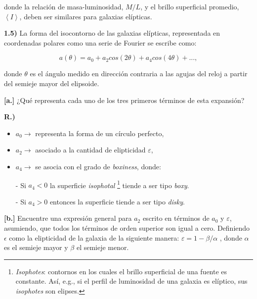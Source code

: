 \documentclass[paper=a4, fontsize=10pt]{scrartcl} %
\begin{document}
donde la relación de masa-luminosidad, $M/L$, y el brillo superficial promedio, $\left< I \right>$, deben ser similares para galaxias elípticas. 

\vspace{0.4cm} 


{\bf{1.5)}} La forma del isocontorno de las galaxias elípticas, representada en coordenadas polares como una serie de Fourier se escribe como:


\begin{equation} \label{eq:1.25} 
a(\theta) = a_0 + a_2cos(2\theta) + a_4cos(4\theta) + ...,
\end{equation}


donde $\theta$ es el ángulo medido en dirección contraria a las agujas del reloj a partir del semieje mayor del elipsoide. 


{\bf{[a.]}} ¿Qué representa cada uno de los tres primeros términos de esta expansión?

\vspace{0.3cm} 

{\bf{R.)}} 

\begin{itemize}
\item $a_0 \rightarrow$ representa la forma de un círculo perfecto, 
\item $a_2 \rightarrow$ asociado a la cantidad de elipticidad $\varepsilon$, 
\item $a_4 \rightarrow$ se asocia con el grado de {\textit{boxiness}}, donde: 
\item[-] Si $a_4 <0$ la superficie {\textit{isophotal}} {\footnote{{\textit{Isophotes}}: contornos en los cuales el brillo superficial de una fuente es constante. Así, e.g., si el perfil de luminosidad de una galaxia es elíptico, sus {\textit{isophotes}} son elipses.}} tiende a ser tipo {\textit{boxy}}. 
\item[-] Si $a_4 >0$ entonces la superficie tiende a ser tipo {\textit{disky}}.

\end{itemize}

\vspace{0.4cm} 

{\bf{[b.]}}   Encuentre una expresión general para $a_2$ escrito en términos de $a_0$ y $\varepsilon$, asumiendo, que todos los términos de orden superior son igual a cero. Definiendo $\epsilon$ como la elipticidad de la galaxia de la siguiente manera: $\varepsilon  = 1 - \beta/\alpha$ , donde $\alpha$ es el semieje mayor y $\beta$ el semieje menor.
\end{document}

